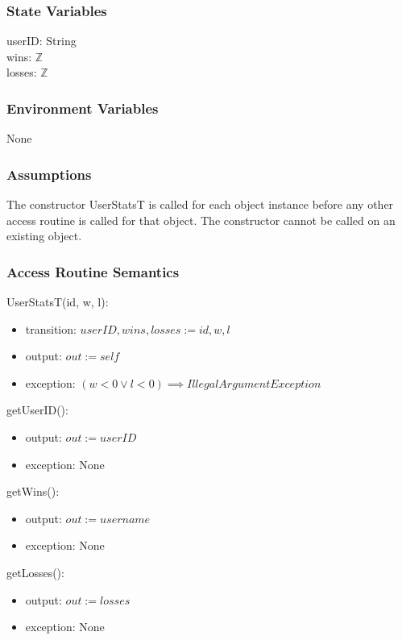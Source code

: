 \documentclass[12pt, titlepage]{article}
\begin{document}
\subsubsection{State Variables}

userID: String \\
wins: $\mathbb{Z}$ \\
losses:  $\mathbb{Z}$

\subsubsection{Environment Variables}
None

\subsubsection{Assumptions}
The constructor UserStatsT is called for each object instance before any other access routine is called for that object. The constructor cannot be called on an existing object.

\subsubsection{Access Routine Semantics}

\noindent UserStatsT(id, w, l):
\begin{itemize}
\item transition: $userID, wins, losses := id, w, l$
\item output: $out := self$
\item exception: $(w < 0 \lor l < 0) \implies IllegalArgumentException$
\end{itemize}

\noindent getUserID():
\begin{itemize}
\item output: $out := userID$
\item exception: None
\end{itemize}

\noindent getWins():
\begin{itemize}
\item output: $out := username$
\item exception: None
\end{itemize}

\noindent getLosses():
\begin{itemize}
\item output: $out := losses$
\item exception: None
\end{itemize}
\end{document}
